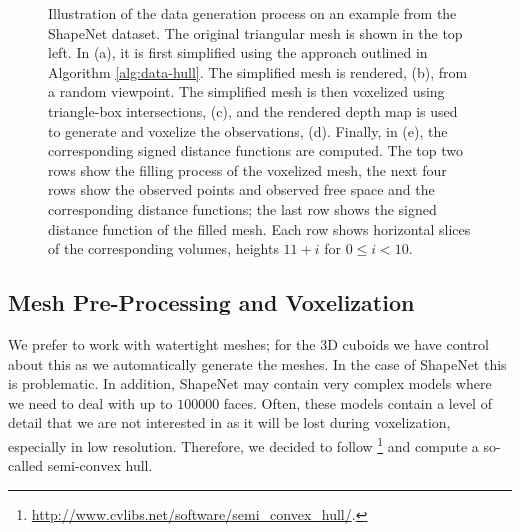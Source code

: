 \begin{figure}
  \caption{Illustration of the data generation process on an example from
  the ShapeNet dataset. The original triangular mesh is
  shown in the top left. In (a), it is first simplified using the approach outlined in
  Algorithm \ref{alg:data-hull}. The simplified mesh is rendered, (b), from
  a random viewpoint. The simplified mesh is then voxelized using triangle-box
  intersections, (c), and the rendered depth map is used to generate and voxelize
  the observations, (d). Finally, in (e), the corresponding signed distance
  functions are computed. The top two rows show the filling process of the voxelized
  mesh, the next four rows show the observed points and observed free space
  and the corresponding distance functions; the last row shows the
  signed distance function of the filled mesh. Each row shows 
  horizontal slices of the corresponding volumes, \ie heights $11 + i$ for $0 \leq i < 10$.}
  \label{fig:data-3d-process}
\end{figure}

\subsection{Mesh Pre-Processing and Voxelization}

We prefer to work with watertight meshes; for the 3D cuboids we have control
about this as we automatically generate the meshes. In the case of ShapeNet
this is problematic. In addition, ShapeNet may contain very complex models 
where we need to deal with up to $100000$ faces.
Often, these models
contain a level of detail that we are not interested in as it will be
lost during voxelization, especially in low resolution. Therefore,
we decided to follow \cite{GueneyGeiger:2015}\footnote{
  \url{http://www.cvlibs.net/software/semi_convex_hull/}.
} and compute a so-called
semi-convex hull.

